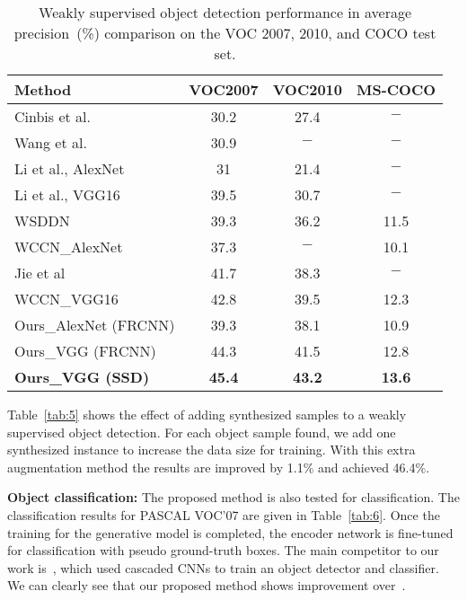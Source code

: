 \documentclass[runningheads]{llncs}
\begin{document}
\begin{table}[t]
{\small
\tabcolsep=0.3cm
\caption{Weakly supervised object detection performance in average precision~(\%) comparison on the VOC 2007, 2010, and COCO test set.}
 \label{tab:4}
\begin{center}
\begin{tabular}{lccc}
\toprule
Method &  VOC2007 & VOC2010 & MS-COCO \\
\midrule
Cinbis et al.~\cite{cinbis} &30.2& 27.4 & $-$ \\
Wang et al.~\cite{wang14}& 30.9& $-$& $-$   \\
Li et al., AlexNet~\cite{li16}& 31& 21.4 & $-$  \\
Li et al., VGG16~\cite{li16} & 39.5& 30.7 & $-$  \\
WSDDN~\cite{bilen16} & 39.3& 36.2 & 11.5   \\
WCCN\_AlexNet~\cite{diba} & 37.3 & $-$ & 10.1 \\
Jie et al~\cite{jieSelf} & {41.7} & {38.3} & $-$\\
WCCN\_VGG16~\cite{diba} & 42.8 & 39.5 & 12.3  \\
\midrule
Ours\_AlexNet (FRCNN)  & 39.3 & 38.1 & 10.9 \\
Ours\_VGG (FRCNN) & 44.3 & {41.5} &  12.8 \\
\textbf{Ours\_VGG (SSD)} & \textbf{45.4}& \textbf{43.2}  &  \textbf{13.6} \\
\bottomrule
\end{tabular}
\end{center}}
\vspace{-0.5cm}
\end{table}


Table~\ref{tab:5} shows the effect of adding synthesized samples to a weakly supervised object detection. For each object sample found, we add one synthesized instance to increase the data size for training. With this extra augmentation method the results are improved by 1.1\% and achieved 46.4\%.

\textbf{Object classification:} The proposed method is also tested for classification. The classification results for PASCAL VOC'07 are given in Table~\ref{tab:6}. Once the training for the generative model is completed, the encoder network is fine-tuned for classification with pseudo ground-truth boxes. The main competitor to our work is~\cite{diba}, which used cascaded CNNs to train an object detector and classifier. We can clearly see that our proposed method shows improvement over~\cite{diba}.
\end{document}
